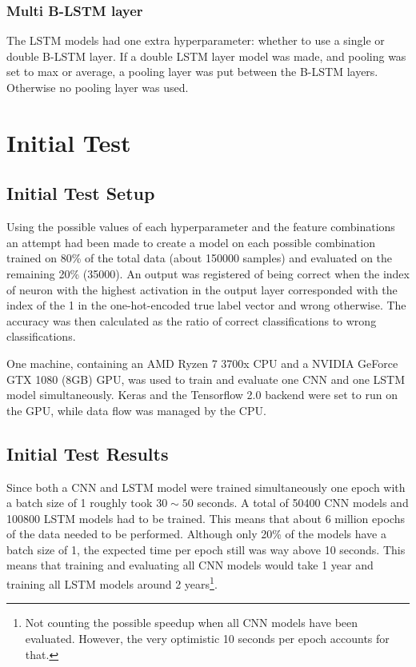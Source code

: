 \subsubsection{Multi B-LSTM layer}
The LSTM models had one extra hyperparameter: whether to use a single or double B-LSTM layer. If a double LSTM layer model was made, and pooling was set to max or average, a pooling layer was put between the B-LSTM layers. Otherwise no pooling layer was used.


\section{Initial Test}
\subsection{Initial Test Setup}
 Using the possible values of each hyperparameter and the feature combinations an attempt had been made to create a model on each possible combination trained on 80\% of the total data (about 150000 samples) and evaluated on the remaining 20\% (35000). An output was registered of being correct when the index of neuron with the highest activation in the output layer corresponded with the index of the 1 in the one-hot-encoded true label vector and wrong otherwise. The accuracy was then calculated as the ratio of correct classifications to wrong classifications.

 One machine, containing an AMD Ryzen 7 3700x CPU and a NVIDIA GeForce GTX 1080 (8GB) GPU, was used to train and evaluate one CNN and one LSTM model simultaneously. Keras and the Tensorflow 2.0 backend were set to run on the GPU, while data flow was managed by the CPU.

\subsection{Initial Test Results}
Since both a CNN and LSTM model were trained simultaneously one epoch with a batch size of 1 roughly took $30\sim50$ seconds. A total of 50400 CNN models and 100800 LSTM models had to be trained. This means that about 6 million epochs of the data needed to be performed. Although only 20\% of the models have a batch size of 1, the expected time per epoch still was way above 10 seconds. This means that training and evaluating all CNN models would take 1 year and training all LSTM models around 2 years\footnote{Not counting the possible speedup when all CNN models have been evaluated. However, the very optimistic 10 seconds per epoch accounts for that.}.

